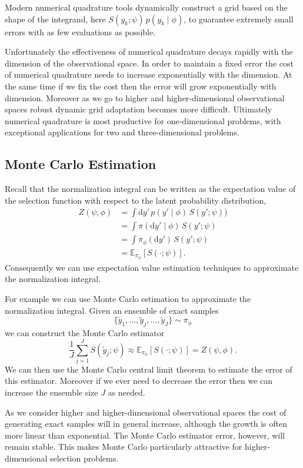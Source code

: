 \documentclass[
  letterpaper,
  DIV=11,
  numbers=noendperiod]{scrartcl}
\begin{document}
Modern numerical quadrature tools dynamically construct a grid based on
the shape of the integrand, here
\(S(y_{k}; \psi ) \, p(y_{k} \mid \phi)\), to guarantee extremely small
errors with as few evaluations as possible.

Unfortunately the effectiveness of numerical quadrature decays rapidly
with the dimension of the observational space. In order to maintain a
fixed error the cost of numerical quadrature needs to increase
exponentially with the dimension. At the same time if we fix the cost
then the error will grow exponentially with dimension. Moreover as we go
to higher and higher-dimensional observational spaces robust dynamic
grid adaptation becomes more difficult. Ultimately numerical quadrature
is most productive for one-dimensional problems, with exceptional
applications for two and three-dimensional problems.

\subsection{Monte Carlo Estimation}\label{monte-carlo-estimation}

Recall that the normalization integral can be written as the expectation
value of the selection function with respect to the latent probability
distribution, \begin{align*}
Z(\psi, \phi)
&=
\int \mathrm{d}y' \, p(y' \mid \phi ) \, S(y'; \psi ))
\\
&=
\int \pi( \mathrm{d}y' \mid \phi) \, S(y'; \psi )
\\
&=
\int \pi_{\phi}( \mathrm{d}y' ) \, S(y'; \psi )
\\
&=
\mathbb{E}_{\pi_{\phi}}[ S(\cdot ; \psi) ].
\end{align*} Consequently we can use expectation value estimation
techniques to approximate the normalization integral.

For example we can use Monte Carlo estimation to approximate the
normalization integral. Given an ensemble of exact samples \[
\{ \tilde{y}_{1}, \ldots, \tilde{y}_{j}, \ldots, \tilde{y}_{J} \}
\sim \pi_{\phi}
\] we can construct the Monte Carlo estimator \[
\frac{1}{J} \sum_{j = 1}^{J} S(\tilde{y}_{j}; \psi)
\approx
\mathbb{E}_{\pi_{\phi}}[ S(\cdot ; \psi) ]
=
Z(\psi, \phi).
\] We can then use the Monte Carlo central limit theorem to estimate the
error of this estimator. Moreover if we ever need to decrease the error
then we can increase the ensemble size \(J\) as needed.

As we consider higher and higher-dimensional observational spaces the
cost of generating exact samples will in general increase, although the
growth is often more linear than exponential. The Monte Carlo estimator
error, however, will remain stable. This makes Monte Carlo particularly
attractive for higher-dimensional selection problems.
\end{document}
